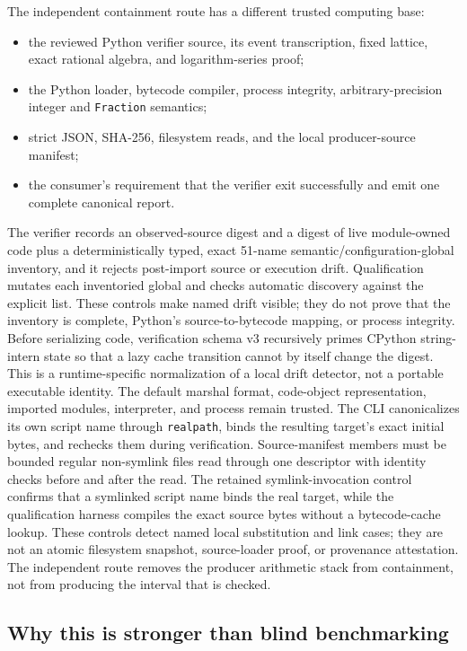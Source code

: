 \documentclass[11pt]{article}
\theoremstyle{definition}
\begin{document}
The independent containment route has a different trusted computing base:
\begin{itemize}[leftmargin=*]
  \item the reviewed Python verifier source, its event transcription, fixed lattice, exact
  rational algebra, and logarithm-series proof;
  \item the Python loader, bytecode compiler, process integrity, arbitrary-precision integer and
  \texttt{Fraction} semantics;
  \item strict JSON, SHA-256, filesystem reads, and the local producer-source manifest;
  \item the consumer's requirement that the verifier exit successfully and emit one complete
  canonical report.
\end{itemize}
The verifier records an observed-source digest and a digest of live module-owned code plus a
deterministically typed, exact 51-name semantic/configuration-global inventory, and it rejects
post-import source or execution drift.  Qualification mutates each inventoried global and checks
automatic discovery against the explicit list.  These controls make named drift visible; they do
not prove that the inventory is complete, Python's source-to-bytecode mapping, or process
integrity.
Before serializing code, verification schema v3 recursively primes CPython string-intern state so
that a lazy cache transition cannot by itself change the digest.  This is a runtime-specific
normalization of a local drift detector, not a portable executable identity.  The default marshal
format, code-object representation, imported modules, interpreter, and process remain trusted.
The CLI canonicalizes its own script name through \texttt{realpath}, binds the resulting target's
exact initial bytes, and rechecks them during verification.  Source-manifest members must be
bounded regular non-symlink files read through one descriptor with identity checks before and
after the read.  The retained symlink-invocation control confirms that a symlinked script name
binds the real target, while the qualification harness compiles the exact source bytes without a
bytecode-cache lookup.  These controls detect named local substitution and link cases; they are
not an atomic filesystem snapshot, source-loader proof, or provenance attestation.
The independent route removes the producer arithmetic stack from containment, not from producing
the interval that is checked.

\subsection{Why this is stronger than blind benchmarking}
\end{document}
